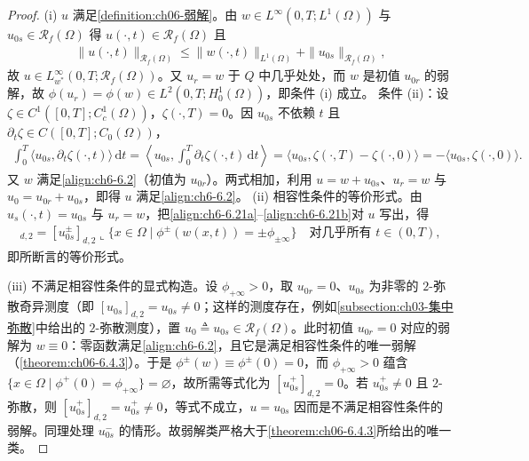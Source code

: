 \documentclass[../../main.tex]{subfiles}%
\begin{document}
\begin{proof}
(i) $u$ 满足\cref{definition:ch06-弱解}。由 $w\in L^\infty(0,T;L^1(\Omega))$ 与 $u_{0s}\in\mathscr{R}_f(\Omega)$ 得 $u(\cdot,t)\in\mathscr{R}_f(\Omega)$ 且
\begin{align*}
\|u(\cdot,t)\|_{\mathscr{R}_f(\Omega)}\leqslant\|w(\cdot,t)\|_{L^1(\Omega)}+\|u_{0s}\|_{\mathscr{R}_f(\Omega)},
\end{align*}
故 $u\in L^\infty_{w^*}(0,T;\mathscr{R}_f(\Omega))$。又 $u_r=w$ 于 $Q$ 中几乎处处，而 $w$ 是初值 $u_{0r}$ 的弱解，故 $\phi(u_r)=\phi(w)\in L^2(0,T;H^1_0(\Omega))$，即条件 (i) 成立。
条件 (ii)：设 $\zeta\in C^1([0,T];C^1_c(\Omega))$，$\zeta(\cdot,T)=0$。因 $u_{0s}$ 不依赖 $t$ 且 $\partial
_t\zeta\in 
C([0,T];C_0(\Omega))$，
\begin{align*}
\int_0^T\langle u_{0s},\partial_t\zeta(\cdot,t)\rangle\,\mathrm{d}t
=\left\langle u_{0s},\int_0^T\partial_t\zeta(\cdot,t)\,\mathrm{d}t\right\rangle
=\langle u_{0s},\zeta(\cdot,T)-\zeta(\cdot,0)\rangle
=-\langle u_{0s},\zeta(\cdot,0)\rangle .
\end{align*}
又 $w$ 满足\eqref{align:ch6-6.2}（初值为 $u_{0r}$）。两式相加，利用 $u=w+u_{0s}$、$u_r=w$ 与 $u_0=u_{0r}+u_{0s}$，即得 $u$ 满足\eqref{align:ch6-6.2}。
(ii) 相容性条件的等价形式。由 $u_s(\cdot,t)=u_{0s}$ 与 $u_r=w$，把\eqref{align:ch6-6.21a}--\eqref{align:ch6-6.21b}对 $u$ 写出，得
\begin{align*}
[u^\pm_{0s}]_{d,2}=[u^\pm_{0s}]_{d,2}\llcorner\{x\in\Omega\mid\phi^\pm(w(x,t))=\pm\phi_{\pm\infty}\}
\quad\text{对几乎所有 }t\in(0,T),
\end{align*}
即所断言的等价形式。

(iii) 不满足相容性条件的显式构造。设 $\phi_{+\infty}>0$，取 $u_{0r}=0$、$u_{0s}$ 为非零的 $2$-弥散奇异测度（即 $[u_{0s}]_{d,2}=u_{0s}\neq0$；这样的测度存在，例如\cref{subsection:ch03-集中弥散}中给出的 $2$-弥散测度），置 $u_0\triangleq u_{0s}\in\mathscr{R}_f(\Omega)$。此时初值 $u_{0r}=0$ 对应的弱解为 $w\equiv0$：零函数满足\eqref{align:ch6-6.2}，且它是满足相容性条件的唯一弱解（\cref{theorem:ch06-6.4.3}）。于是 $\phi^\pm(w)\equiv\phi^\pm(0)=0$，而 $\phi_{+\infty}>0$ 蕴含 $\{x\in\Omega\mid\phi^+(0)=\phi_{+\infty}\}=\varnothing$，故所需等式化为 $[u^+_{0s}]_{d,2}=0$。若 $u^+_{0s}\neq0$ 且 $2$-弥散，则 $[u^+_{0s}]_{d,2}=u^+_{0s}\neq0$，等式不成立，$u=u_{0s}$ 因而是不满足相容性条件的弱解。同理处理 $u^-_{0s}$ 的情形。故弱解类严格大于\cref{theorem:ch06-6.4.3}所给出的唯一类。
\end{proof}
\end{document}

